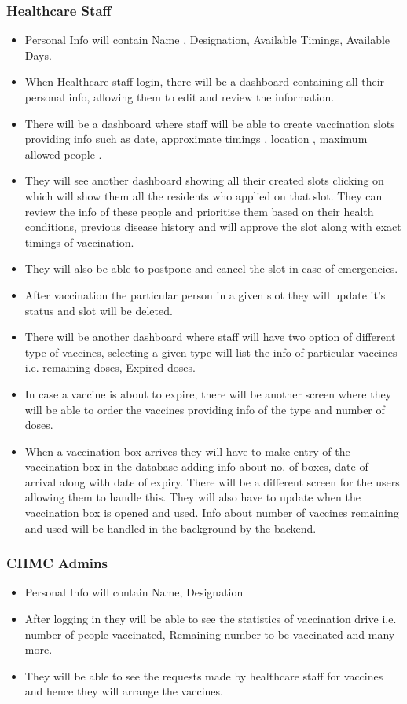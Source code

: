 \documentclass[10pt,twocolumn,letterpaper]{article}
\begin{document}
\subsubsection{Healthcare Staff}
\begin{itemize}
    \item Personal Info will contain Name , Designation, Available Timings, Available Days.
    \item When Healthcare staff login, there will be a dashboard containing all their personal info, allowing them to edit and review the information.
    \item There will be a dashboard where staff will be able to create vaccination slots providing info such as date, approximate timings , location , maximum allowed people . 
    \item They will see another dashboard showing all their created slots clicking on which will show them all the residents who applied on that slot. They can review the info of these people and prioritise them based on their health conditions, previous disease history and will approve the slot along with exact timings of vaccination.
    \item They will also be able to postpone and cancel the slot in case of emergencies.
    \item After vaccination the particular person in a given slot they will update it's status and slot will be deleted.
    \item There will be another dashboard where staff will have two option of different type of vaccines, selecting a given type will list the info of particular vaccines i.e. remaining doses, Expired doses.
    \item In case a vaccine is about to expire, there will be another screen where they will be able to order the vaccines providing info of the type and number of doses.
    \item When a vaccination box arrives they will have to make entry of the vaccination box in the database adding info about no. of boxes, date of arrival along with date of expiry. There will be a different screen for the users allowing them to handle this. They will also have to update when the vaccination box is opened and used. Info about number of vaccines remaining and used will be handled in the background by the backend.
\end{itemize}

\subsubsection{CHMC Admins}
\begin{itemize}
    \item Personal Info will contain Name, Designation
    \item After logging in they will be able to see the statistics of vaccination drive i.e. number of people vaccinated, Remaining number to be vaccinated and many more.
    \item They will be able to see the requests made by healthcare staff for vaccines and hence they will arrange the vaccines.
\end{itemize}
\end{document}
